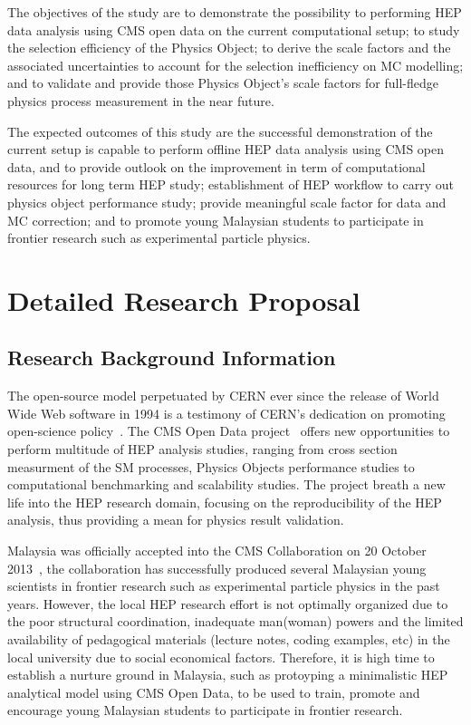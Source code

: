 \documentclass[]{article}
\begin{document}
The objectives of the study are to demonstrate the possibility to performing HEP data analysis using CMS open data on the current computational setup; to study the selection efficiency of the Physics Object; to derive the scale factors and the associated uncertainties to account for the selection inefficiency on MC modelling; and to validate and provide those Physics Object's scale factors for full-fledge physics process measurement in the near future.

The expected outcomes of this study are the successful demonstration of the current setup is capable to perform offline HEP data analysis using CMS open data, and to provide outlook on the improvement in term of computational resources for long term HEP study; establishment of HEP workflow to carry out physics object performance study; provide meaningful scale factor for data and MC correction; and to promote young Malaysian students to participate in frontier research such as experimental particle physics.

\section{Detailed Research Proposal}
\subsection{Research Background Information}

The open-source model perpetuated by CERN ever since the release of World Wide Web software in 1994 is a testimony of CERN's dedication on promoting open-science policy~\cite{cernopendata}. The CMS Open Data project~\cite{Lassila-Perini:2021xzn} offers new opportunities to perform multitude of HEP analysis studies, ranging from cross section measurment of the SM processes, Physics Objects performance studies to computational benchmarking and scalability studies. The project breath a new life into the HEP research domain, focusing on the reproducibility of the HEP analysis, thus providing a mean for physics result validation.

Malaysia was officially accepted into the CMS Collaboration on 20 October 2013~\cite{cmsmalay}, the collaboration has successfully produced several Malaysian young scientists in frontier research such as experimental particle physics in the past years. However, the local HEP research effort is not optimally organized due to the poor structural coordination, inadequate man(woman) powers and the limited availability of pedagogical materials (lecture notes, coding examples, etc) in the local university due to social economical factors. Therefore, it is high time to establish a nurture ground in Malaysia, such as protoyping a minimalistic HEP analytical model using CMS Open Data, to be used to train, promote and encourage young Malaysian students to participate in frontier research.
\end{document}
